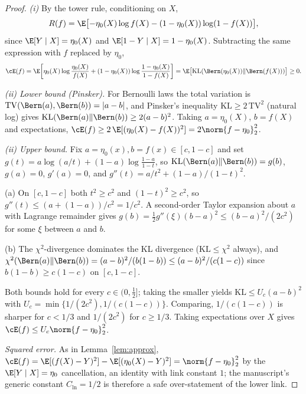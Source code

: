 \begin{proof}
\emph{(i)} By the tower rule, conditioning on $X$,
\[
  R(f) = \E\bigl[ -\eta_0(X)\log f(X) - (1-\eta_0(X))\log(1-f(X)) \bigr],
\]
since $\E[Y \mid X] = \eta_0(X)$ and $\E[1-Y \mid X] = 1 - \eta_0(X)$.
Subtracting the same expression with $f$ replaced by $\eta_0$,
\[
  \cE(f) = \E\!\left[ \eta_0(X)\log\frac{\eta_0(X)}{f(X)}
    + (1-\eta_0(X))\log\frac{1-\eta_0(X)}{1-f(X)} \right]
  = \E\bigl[\mathrm{KL}(\Bern(\eta_0(X)) \| \Bern(f(X)))\bigr] \ge 0.
\]

\emph{(ii) Lower bound (Pinsker).} For Bernoulli laws the total variation is
$\mathrm{TV}(\Bern(a),\Bern(b)) = |a-b|$, and Pinsker's inequality
$\mathrm{KL} \ge 2\,\mathrm{TV}^2$ (natural log) gives
$\mathrm{KL}(\Bern(a)\|\Bern(b)) \ge 2(a-b)^2$. Taking $a = \eta_0(X)$,
$b = f(X)$ and expectations,
$\cE(f) \ge 2\,\E[(\eta_0(X)-f(X))^2] = 2\norm{f-\eta_0}_2^2$.

\emph{(ii) Upper bound.} Fix $a = \eta_0(x), b = f(x) \in [c,1-c]$ and set
$g(t) = a\log(a/t) + (1-a)\log\!\frac{1-a}{1-t}$, so
$\mathrm{KL}(\Bern(a)\|\Bern(b)) = g(b)$, $g(a)=0$, $g'(a)=0$, and
$g''(t) = a/t^2 + (1-a)/(1-t)^2$.

(a) On $[c,1-c]$ both $t^2 \ge c^2$ and $(1-t)^2 \ge c^2$, so
$g''(t) \le (a + (1-a))/c^2 = 1/c^2$. A second-order Taylor expansion about $a$
with Lagrange remainder gives $g(b) = \tfrac12 g''(\xi)(b-a)^2 \le
(b-a)^2/(2c^2)$ for some $\xi$ between $a$ and $b$.

(b) The $\chi^2$-divergence dominates the KL divergence
($\mathrm{KL} \le \chi^2$ always), and
$\chi^2(\Bern(a)\|\Bern(b)) = (a-b)^2/(b(1-b)) \le (a-b)^2/(c(1-c))$ since
$b(1-b) \ge c(1-c)$ on $[c,1-c]$.

Both bounds hold for every $c \in (0,\tfrac12]$; taking the smaller yields
$\mathrm{KL} \le U_c (a-b)^2$ with $U_c = \min\{1/(2c^2), 1/(c(1-c))\}$.
Comparing, $1/(c(1-c))$ is sharper for $c < 1/3$ and $1/(2c^2)$ for
$c \ge 1/3$. Taking expectations over $X$ gives
$\cE(f) \le U_c \norm{f-\eta_0}_2^2$.

\emph{Squared error.} As in Lemma~\ref{lem:approx},
$\cE(f) = \E[(f(X)-Y)^2] - \E[(\eta_0(X)-Y)^2] = \norm{f-\eta_0}_2^2$ by the
$\E[Y\mid X]=\eta_0$ cancellation, an identity with link constant $1$; the
manuscript's generic constant $C_{\text{ln}} = 1/2$ is therefore a safe
over-statement of the lower link.
\end{proof}


